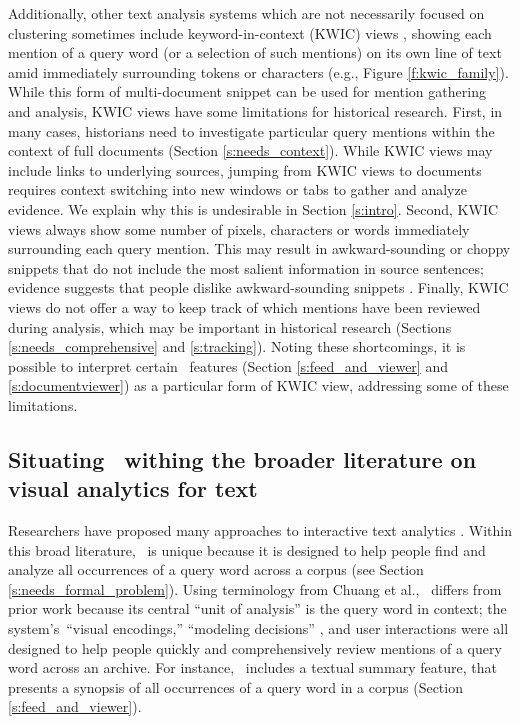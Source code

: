 Additionally, other text analysis systems which are not necessarily focused on clustering sometimes include keyword-in-context (KWIC) views \cite{voyant,oconnor-2014-mitextexplorer}, showing each mention of a query word (or a selection of such mentions) on its own line of text amid immediately surrounding tokens or characters (e.g., Figure \ref{f:kwic_family}).
While this form of multi-document snippet can be used for mention gathering and analysis, KWIC views have some limitations for historical research.
First, in many cases, historians need to investigate particular query mentions within the context of full documents (Section \ref{s:needs_context}). 
While KWIC views may include links to underlying sources, jumping from KWIC views to documents requires context switching into new windows or tabs to gather and analyze evidence.
We explain why this is undesirable in Section \ref{s:intro}.
Second, KWIC views always show some number of pixels, characters or words immediately surrounding each query mention.
This may result in awkward-sounding or choppy snippets that do not include the most salient information in source sentences;
evidence suggests that people dislike awkward-sounding snippets \cite{ryenwhitesnippets}.
Finally, KWIC views do not offer a way to keep track of which mentions have been reviewed during analysis, which may be important in historical research (Sections \ref{s:needs_comprehensive} and \ref{s:tracking}).
Noting these shortcomings, it is possible to interpret certain \ours~features (Section \ref{s:feed_and_viewer} and \ref{s:documentviewer}) as a particular form of KWIC view, addressing some of these limitations.

\subsection{Situating \ours~withing the broader literature on visual analytics for text}\label{s:related_comparison}

Researchers have proposed many approaches to interactive text analytics \cite{tiara,overview,Gorg2013JigsawReflections,serendip,HierarchicalTopics,chuangheer,termite,tiisclusterone,tiisclustertwo,tiisclusterthree,starspire,pivotpaths,eventriver,jasim2021communitypulse}. 
Within this broad literature, \ours~is unique because it is designed to help people find and analyze all occurrences of a query word across a corpus (see Section \ref{s:needs_formal_problem}).
Using terminology from Chuang et al., \ours~differs from prior work because its central ``unit of analysis'' \cite{chuangheer} is the query word in context; the system's~``visual encodings,'' ``modeling decisions'' \cite{chuangheer}, and user interactions were all designed to help people quickly and comprehensively review mentions of a query word across an archive.
For instance, \ours~includes a textual summary feature, that presents a synopsis of all occurrences of a query word in a corpus (Section \ref{s:feed_and_viewer}).

